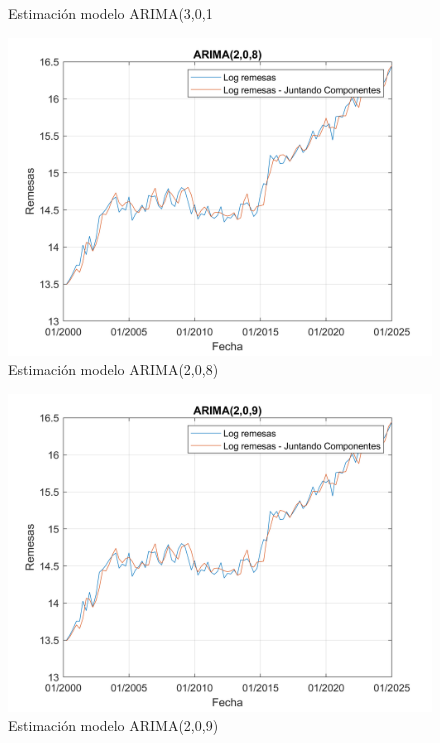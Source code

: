 \documentclass{article}
\theoremstyle{remark}
\theoremstyle{definition}
\begin{document}
\begin{enumerate}[label=\emph{\alph*})]
\begin{tcolorbox}[title=Soluci\'on 3.e]
\begin{figure}[H]
                \caption{Estimación modelo ARIMA(3,0,1}
                \label{fig:enter-label}
            \end{figure}
            \begin{figure}[H]
                \centering
                \includegraphics[width=0.5\linewidth]{docs/Arima_1_0_8.png}
                \caption{Estimación modelo ARIMA(2,0,8)}
                \label{fig:enter-label}
            \end{figure}

            \begin{figure}[H]
                \centering
                \includegraphics[width=0.5\linewidth]{docs/Arima_2_0_9.png}
                \caption{Estimación modelo ARIMA(2,0,9)}
                \label{fig:enter-label}
            \end{figure}
        \end{tcolorbox}

        
        

\end{enumerate}
\end{document}
